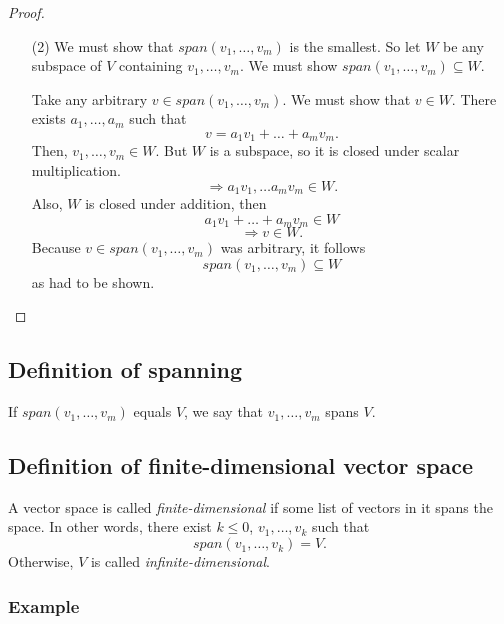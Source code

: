 \documentclass[11pt]{article}
\begin{document}
\begin{proof}
\begin{enumerate}
            \item[(2)] We must show that \(span(v_1, \dots,v_m)\) is the smallest. So let $W$ be any subspace of $V$ containing \(v_1, \dots, v_m.\) We must show \(span(v_1, \dots,v_m) \subseteq W.\) 
            
            Take any arbitrary \(v \in span(v_1, \dots, v_m).\) We must show that \(v \in W\). There exists \(a_1, \dots, a_m\) such that \[v = a_1 v_1 + \dots + a_m v_m.\] Then, \(v_1, \dots, v_m \in W.\) But $W$ is a subspace, so it is closed under scalar multiplication. \[\Rightarrow a_1 v_1, \dots a_m v_m \in W.\] Also, $W$ is closed under addition, then \[a_1 v_1 + \dots + a_m v_m \in W\] \[\Rightarrow v \in W.\] Because \(v \in span(v_1, \dots, v_m)\) was arbitrary, it follows \[span(v_1, \dots, v_m) \subseteq W\] as had to be shown.
        \end{enumerate}
    \end{proof}

    \subsection{Definition of spanning}

    If \(span(v_1, \dots, v_m)\) equals $V$, we say that \(v_1, \dots, v_m\) spans $V$.

    \subsection{Definition of finite-dimensional vector space}

    A vector space is called \emph{finite-dimensional} if some list of vectors in it spans the space. In other words, there exist \(k \leq 0\), \(v_1, \dots, v_k\) such that \[span(v_1, \dots, v_k) = V.\] Otherwise, $V$ is called \emph{infinite-dimensional}. 

    \subsubsection{Example}
\end{document}
